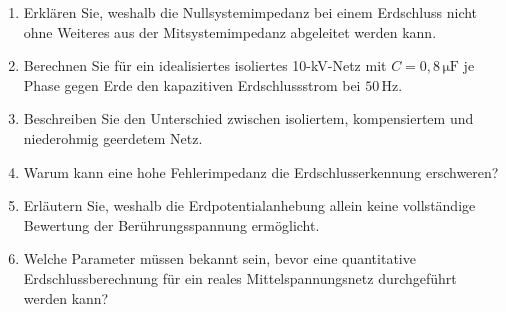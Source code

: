 \begin{enumerate}
  \item Erklären Sie, weshalb die Nullsystemimpedanz bei einem Erdschluss
        nicht ohne Weiteres aus der Mitsystemimpedanz abgeleitet werden kann.
  \item Berechnen Sie für ein idealisiertes isoliertes 10-kV-Netz mit
        \(C=0{,}8\,\mathrm{\mu F}\) je Phase gegen Erde den kapazitiven
        Erdschlussstrom bei \(50\,\mathrm{Hz}\).
  \item Beschreiben Sie den Unterschied zwischen isoliertem,
        kompensiertem und niederohmig geerdetem Netz.
  \item Warum kann eine hohe Fehlerimpedanz die Erdschlusserkennung erschweren?
  \item Erläutern Sie, weshalb die Erdpotentialanhebung allein keine
        vollständige Bewertung der Berührungsspannung ermöglicht.
  \item Welche Parameter müssen bekannt sein, bevor eine quantitative
        Erdschlussberechnung für ein reales Mittelspannungsnetz durchgeführt
        werden kann?
\end{enumerate}